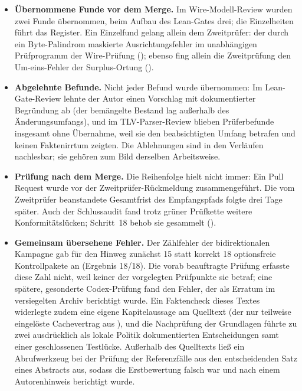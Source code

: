 \begin{itemize}[leftmargin=1.6em]
    \item \textbf{Übernommene Funde vor dem Merge.} Im Wire-Modell-Review wurden zwei Funde übernommen,
        beim Aufbau des Lean-Gates drei; die Einzelheiten führt das Register. Ein Einzelfund
        gelang allein dem Zweitprüfer: der durch ein Byte-Palindrom maskierte Ausrichtungsfehler im
        unabhängigen Prüfprogramm der Wire-Prüfung (); ebenso fing allein die
        Zweitprüfung den Um-eins-Fehler der Surplus-Ortung ().
    \item \textbf{Abgelehnte Befunde.} Nicht jeder Befund wurde übernommen: Im Lean-Gate-Review lehnte
        der Autor einen Vorschlag mit dokumentierter Begründung ab (der bemängelte Bestand lag außerhalb
        des Änderungsumfangs), und im TLV-Parser-Review blieben Prüferbefunde insgesamt ohne Übernahme,
        weil sie den beabsichtigten Umfang betrafen und keinen Faktenirrtum zeigten. Die Ablehnungen
        sind in den Verläufen nachlesbar; sie gehören zum Bild derselben Arbeitsweise.
    \item \textbf{Prüfung nach dem Merge.} Die Reihenfolge hielt nicht immer: Ein Pull Request wurde vor der
        Zweitprüfer-Rückmeldung zusammengeführt. Die vom Zweitprüfer beanstandete Gesamtfrist des
        Empfangspfads folgte drei Tage später. Auch der Schlussaudit fand
        trotz grüner Prüfkette weitere Konformitätslücken; Schritt~18 behob sie gesammelt
        ().
    \item \textbf{Gemeinsam übersehene Fehler.} Der Zählfehler der bidirektionalen Kampagne gab für
        den Hinweg zunächst 15 statt korrekt 18 optionsfreie Kontrollpakete an (Ergebnis 18/18). Die vorab
        beauftragte Prüfung erfasste diese Zahl nicht, weil keiner der vorgelegten Prüfpunkte sie
        betraf; eine spätere, gesonderte Codex-Prüfung fand den Fehler, der als Erratum im
        versiegelten Archiv berichtigt wurde. Ein Faktencheck dieses Textes
        widerlegte zudem eine eigene Kapitelaussage am Quelltext (der nur teilweise eingelöste
        Cachevertrag aus ), und die Nachprüfung der Grundlagen führte zu zwei
        ausdrücklich als lokale Politik dokumentierten Entscheidungen samt einer geschlossenen
        Testlücke. Außerhalb des
        Quelltexts ließ ein Abrufwerkzeug bei der Prüfung der Referenzfälle aus 
        den entscheidenden Satz eines Abstracts aus, sodass die Erstbewertung falsch war und nach einem
        Autorenhinweis berichtigt wurde.
\end{itemize}


